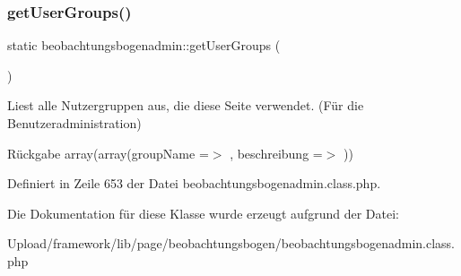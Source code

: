 \mbox{\label{classbeobachtungsbogenadmin_a6f3bf1022ae36389e0cc5434c540744f}} 
\subsubsection{\texorpdfstring{get\+User\+Groups()}{getUserGroups()}}
{\footnotesize\ttfamily static beobachtungsbogenadmin\+::get\+User\+Groups (\begin{DoxyParamCaption}{ }\end{DoxyParamCaption})\hspace{0.3cm}{\ttfamily [static]}}

Liest alle Nutzergruppen aus, die diese Seite verwendet. (Für die Benutzeradministration) \begin{DoxyReturn}{Rückgabe}
array(array(\textquotesingle{}group\+Name\textquotesingle{} =$>$ \textquotesingle{}\textquotesingle{}, \textquotesingle{}beschreibung\textquotesingle{} =$>$ \textquotesingle{}\textquotesingle{})) 
\end{DoxyReturn}


Definiert in Zeile 653 der Datei beobachtungsbogenadmin.\+class.\+php.



Die Dokumentation für diese Klasse wurde erzeugt aufgrund der Datei\+:\begin{DoxyCompactItemize}
\item 
Upload/framework/lib/page/beobachtungsbogen/beobachtungsbogenadmin.\+class.\+php\end{DoxyCompactItemize}
